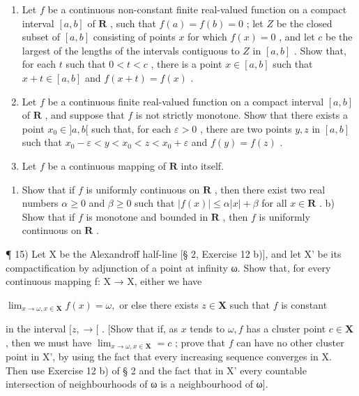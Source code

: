 \begin{enumerate}
\def\labelenumi{\arabic{enumi})}
\setcounter{enumi}{11}
\item
  Let \(f\) be a continuous non-constant finite real-valued function on a compact interval \([a, b]\) of \(\mathbf{R}\) , such that \(f(a) = f(b) = 0\) ; let \(Z\) be the closed subset of \([a, b]\) consisting of points \(x\) for which \(f(x) = 0\) , and let \(c\) be the largest of the lengths of the intervals contiguous to \(Z\) in \([a, b]\) . Show that, for each \(t\) such that \(0 < t < c\) , there is a point \(x \in [a, b]\) such that \(x + t \in [a, b]\) and \(f(x + t) = f(x)\) .
\item
  Let \(f\) be a continuous finite real-valued function on a compact interval \([a, b]\) of \(\mathbf{R}\) , and suppose that \(f\) is not strictly monotone. Show that there exists a point \(x_0 \in ]a, b[\) such that, for each \(\varepsilon > 0\) , there are two points \(y, z\) in \([a, b]\) such that \(x_0 - \varepsilon < y < x_0 < z < x_0 + \varepsilon\) and \(f(y) = f(z)\) .
\item
  Let \(f\) be a continuous mapping of \(\mathbf{R}\) into itself.
\end{enumerate}

\begin{enumerate}
\def\labelenumi{\alph{enumi})}
\tightlist
\item
  Show that if \(f\) is uniformly continuous on \(\mathbf{R}\) , then there exist two real numbers \(\alpha \geqslant 0\) and \(\beta \geqslant 0\) such that \(|f(x)| \leqslant \alpha |x| + \beta\) for all \(x \in \mathbf{R}\) . b) Show that if \(f\) is monotone and bounded in \(\mathbf{R}\) , then \(f\) is uniformly continuous on \(\mathbf{R}\) .
\end{enumerate}

¶ 15) Let X be the Alexandroff half-line {[}§ 2, Exercise 12 b){]}, and let X' be its compactification by adjunction of a point at infinity ω. Show that, for every continuous mapping f: X → X, either we have

\(\lim_{x \to \omega, x \in \mathbf{X}} f(x) = \omega,\) or else there exists \(z \in \mathbf{X}\) such that \(f\) is constant

in the interval \([z, \rightarrow[\) . {[}Show that if, as \(x\) tends to \(\omega, f\) has a cluster point \(c \in \mathbf{X}\) , then we must have \(\lim_{x \to \omega, x \in \mathbf{X}} = c\) ; prove that \(f\) can have no other cluster point in X', by using the fact that every increasing sequence converges in X. Then use Exercise 12 b) of § 2 and the fact that in X' every countable intersection of neighbourhoods of ω is a neighbourhood of ω{]}.

